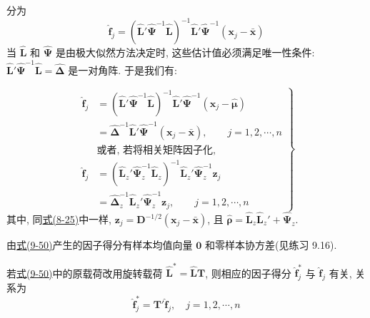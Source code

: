 
分为
\label{eq:9-49}
\begin{equation}
\hat{\mathbf{f}}_j=(\hat{\mathbf{L}}'\hat{\boldsymbol{\Psi}}^{-1}\hat{\mathbf{L}})^{-1}\hat{\mathbf{L}}'\hat{\boldsymbol{\Psi}}^{-1}(\mathbf{x}_j-\bar{\mathbf{x}}) \tag{9-49}
\end{equation}
当 $\hat{\mathbf{L}}$ 和 $\hat{\boldsymbol{\Psi}}$ 是由极大似然方法决定时, 这些估计值必须满足唯一性条件: $\hat{\mathbf{L}}'\hat{\boldsymbol{\Psi}}^{-1}\hat{\mathbf{L}}=\hat{\boldsymbol{\Delta}}$ 是一对角阵. 于是我们有:

\begin{mvbox}
{\centering{}\par}
\label{eq:9-50}
\begin{equation}
\left.\begin{aligned}
\hat{\mathbf{f}}_j&=(\hat{\mathbf{L}}'\hat{\boldsymbol{\Psi}}^{-1}\hat{\mathbf{L}})^{-1}\hat{\mathbf{L}}'\hat{\boldsymbol{\Psi}}^{-1}(\mathbf{x}_j-\hat{\boldsymbol{\mu}})\\
&=\hat{\boldsymbol{\Delta}}^{-1}\hat{\mathbf{L}}'\hat{\boldsymbol{\Psi}}^{-1}(\mathbf{x}_j-\bar{\mathbf{x}}), \qquad j=1,2,\cdots,n\\[4pt]
&\text{或者, 若将相关矩阵因子化,}\\[4pt]
\hat{\mathbf{f}}_j&=(\hat{\mathbf{L}}_z'\hat{\boldsymbol{\Psi}}_z^{-1}\hat{\mathbf{L}}_z)^{-1}\hat{\mathbf{L}}_z'\hat{\boldsymbol{\Psi}}_z^{-1}\mathbf{z}_j\\
&=\hat{\boldsymbol{\Delta}}_z^{-1}\hat{\mathbf{L}}_z'\hat{\boldsymbol{\Psi}}_z^{-1}\mathbf{z}_j, \qquad j=1,2,\cdots,n
\end{aligned}\right\}
\tag{9-50}
\end{equation}
其中, 同\hyperref[eq:8-25]{式(8-25)}中一样, $\mathbf{z}_j=\mathbf{D}^{-1/2}(\mathbf{x}_j-\bar{\mathbf{x}})$, 且 $\hat{\boldsymbol{\rho}}=\hat{\mathbf{L}}_z\hat{\mathbf{L}}_z'+\hat{\boldsymbol{\Psi}}_z$.
\end{mvbox}

由\hyperref[eq:9-50]{式(9-50)}产生的因子得分有样本均值向量 $\mathbf{0}$ 和零样本协方差(见练习 9.16).

若\hyperref[eq:9-50]{式(9-50)}中的原载荷改用旋转载荷 $\hat{\mathbf{L}}^*=\hat{\mathbf{L}}\mathbf{T}$, 则相应的因子得分 $\hat{\mathbf{f}}_j^*$ 与 $\hat{\mathbf{f}}_j$ 有关, 关系为
\[
\hat{\mathbf{f}}_j^*=\mathbf{T}'\hat{\mathbf{f}}_j,\quad j=1,2,\cdots,n
\]

